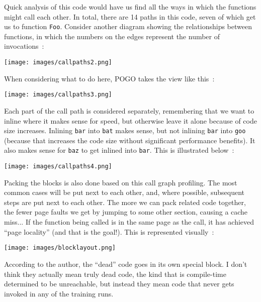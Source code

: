 Quick analysis of this code would have us find all the ways in which the functions might call each other. In total, there are 14 paths in this code, seven of which get us to function \texttt{Foo}. Consider another diagram showing the relationships between functions, in which the numbers on the edges represent the number of invocations~\cite{pogo2}:

\begin{center}
	\texttt{[image: images/callpaths2.png]}
\end{center}

When considering what to do here, POGO takes the view like this~\cite{pogo2}:

\begin{center}
	\texttt{[image: images/callpaths3.png]}
\end{center}

Each part of the call path is considered separately, remembering that we want to inline where it makes sense for speed, but otherwise leave it alone because of code size increases. Inlining \texttt{bar} into \texttt{bat} makes sense, but not inlining \texttt{bar} into \texttt{goo} (because that increases the code size without significant performance benefits). It also makes sense for \texttt{baz} to get inlined into \texttt{bar}. This is illustrated below~\cite{pogo2}:

\begin{center}
	\texttt{[image: images/callpaths4.png]}
\end{center}

Packing the blocks is also done based on this call graph profiling. The most common cases will be put next to each other, and, where possible, subsequent steps are put next to each other. The more we can pack related code together, the fewer page faults we get by jumping to some other section, causing a cache miss... If the function being called is in the same page as the call, it has achieved ``page locality'' (and that is the goal!). This is represented visually~\cite{pogo2}:

\begin{center}
	\texttt{[image: images/blocklayout.png]}
\end{center}

According to the author, the ``dead'' code goes in its own special block. I don't think they actually mean truly dead code, the kind that is compile-time determined to be unreachable, but instead they mean code that never gets invoked in any of the training runs.

